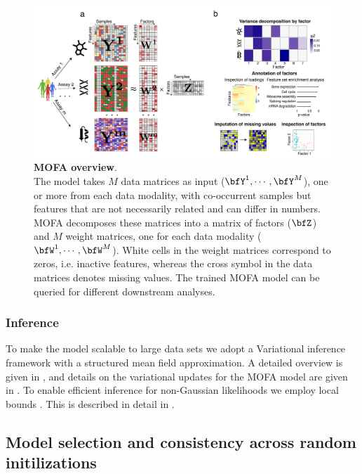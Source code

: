 \begin{figure}[H]
	\begin{center}
		\includegraphics[width=1.0\textwidth]{MOFA}
		\caption{\textbf{MOFA overview}.\\
		The model takes $M$ data matrices as input ($\bfY^1, \cdots, \bfY^M$), one or more from each data modality, with co-occurrent samples but features that are not necessarily related and can differ in numbers. MOFA decomposes these matrices into a matrix of factors ($\bfZ$) and $M$ weight matrices, one for each data modality ($\bfW^1, \cdots, \bfW^M$). White cells in the weight matrices correspond to zeros, i.e. inactive features, whereas the cross symbol in the data matrices denotes missing values. The trained MOFA model can be queried for different downstream analyses.}
		\label{fig:MOFA}
	\end{center}
\end{figure}


\subsubsection{Inference}

To make the model scalable to large data sets we adopt a Variational inference framework with a structured mean field approximation. A detailed overview is given in , and details on the variational updates for the MOFA model are given in . To enable efficient inference for non-Gaussian likelihoods we employ local bounds \cite{Jaakkola2000,Seeger2012}. This is described in detail in .


\subsection{Model selection and consistency across random initilizations} \label{section:mofa_robustness}

